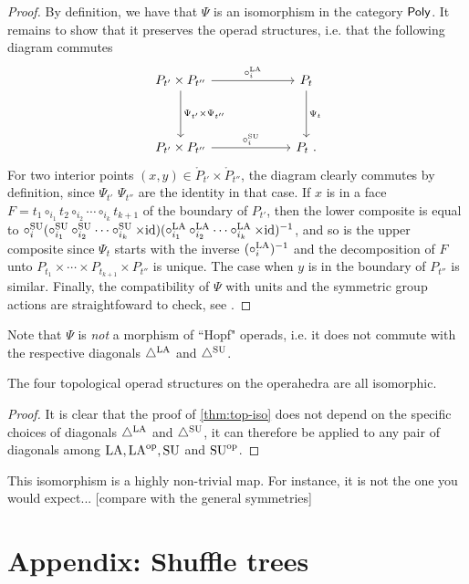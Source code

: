 \begin{proof}
    By definition, we have that $\Psi$ is an isomorphism in the category $\mathsf{Poly}$. 
    It remains to show that it preserves the operad structures, i.e. that the following diagram commutes
    \[
    \vcenter{\hbox{
    \begin{tikzcd}[column sep=2.2cm, row sep=1.3cm]
    P_{t'}\times P_{t''}
    \arrow[r,  "\circ_i^\LA"] 
    \arrow[d,  "\Psi_{t'}\times\Psi_{t''}"]
    & P_{t} \arrow[d,  "\Psi_t"] \\
    P_{t'}\times P_{t''}  
    \arrow[r,  "\circ_i^\SU"]
    & P_{t}\ .
    \end{tikzcd}
    }}\]
    For two interior points $(x,y) \in \mathring P_{t'}\times \mathring P_{t''}$, the diagram clearly commutes by definition, since $\Psi_{t'}$ $\Psi_{t''}$ are the identity in that case. 
    If $x$ is in a face $F=t_1 \circ_{i_1} t_2 \circ_{i_2} \cdots \circ_{i_k} t_{k+1}$ of the boundary of $P_{t'}$, then the lower composite is equal to $\circ_i^{\mathrm{SU}} (\circ_{i_1}^{\mathrm{SU}} \circ_{i_2}^{\mathrm{SU}} \cdots \circ_{i_k}^{\mathrm{SU}} \times \mathrm{id})(\circ_{i_1}^{\mathrm{LA}} \circ_{i_2}^{\mathrm{LA}} \cdots \circ_{i_k}^{\mathrm{LA}} \times \mathrm{id})^{-1}$, and so is the upper composite since $\Psi_t$ starts with the inverse $(\circ_i^{\mathrm{LA}})^{-1}$ and the decomposition of $F$ unto $P_{t_1} \times \cdots \times P_{t_{k+1}} \times P_{t''}$ is unique.
    The case when $y$ is in the boundary of $P_{t''}$ is similar.  
    Finally, the compatibility of $\Psi$ with units and the symmetric group actions are straightfoward to check, see \cite[Def. 4.17 and Thm 4.18]{LA21}.
\end{proof}

Note that $\Psi$ is \emph{not} a morphism of ``Hopf" operads, i.e. it does not commute with the respective diagonals $\triangle^{\mathrm{LA}}$ and $\triangle^{\mathrm{SU}}$. 

\begin{corollary}
    The four topological operad structures on the operahedra are all isomorphic. 
\end{corollary}

\begin{proof}
    It is clear that the proof of \cref{thm:top-iso} does not depend on the specific choices of diagonals $\triangle^{\mathrm{LA}}$ and $\triangle^{\mathrm{SU}}$, it can therefore be applied to any pair of diagonals among $\mathrm{LA}, \mathrm{LA}^{\mathrm{op}}, \mathrm{SU}$ and $\mathrm{SU}^{\mathrm{op}}$. 
\end{proof}


\begin{example}
    This isomorphism is a highly non-trivial map. 
    For instance, it is not the one you would expect...  [compare with the general symmetries]
\end{example}





\section{Appendix: Shuffle trees}
